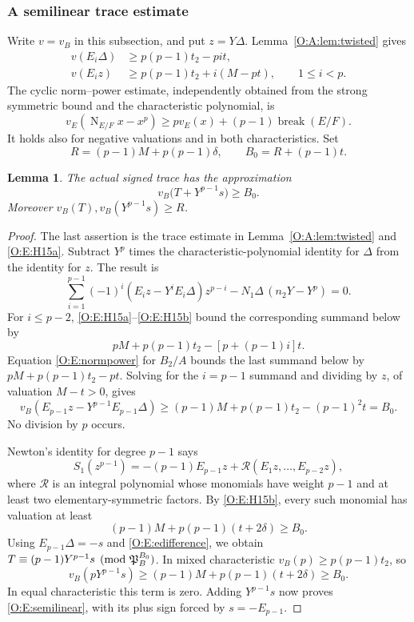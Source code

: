 \documentclass[11pt]{amsart}
\newtheorem{lemma}[theorem]{Lemma}
\theoremstyle{definition}
\theoremstyle{remark}
\newcommand{\Nm}{\operatorname{N}}
\begin{document}
\subsubsection*{A semilinear trace estimate}
Write $v=v_B$ in this subsection, and put $z=Y\Delta$.
Lemma~\ref{O:A:lem:twisted} gives
\begin{align}
 v(E_i\Delta)&\ge p(p-1)t_2-pit,\label{O:E:H15a}\\
 v(E_i z)&\ge p(p-1)t_2+i(M-pt),\qquad1\le i<p.\label{O:E:H15b}
\end{align}
The cyclic norm--power estimate, independently obtained from the
strong symmetric bound and the characteristic polynomial, is
\begin{equation}\label{O:E:normpower}
 v_E(\Nm_{E/F}x-x^p)\ge p v_E(x)+(p-1)\operatorname{break}(E/F).
\end{equation}
It holds also for negative valuations and in both characteristics.
Set
\[
 R=(p-1)M+p(p-1)\delta,\qquad
 B_0=R+(p-1)t.
\]
\begin{lemma}\label{O:E:trace}
The actual signed trace has the approximation
\begin{equation}\label{O:E:semilinear}
 v_B\bigl(T+Y^{p-1}s\bigr)\ge B_0.
\end{equation}
Moreover $v_B(T),v_B(Y^{p-1}s)\ge R$.
\end{lemma}
\begin{proof}
The last assertion is the trace estimate in Lemma~\ref{O:A:lem:twisted} and \eqref{O:E:H15a}.
Subtract $Y^p$ times the characteristic-polynomial identity for
$\Delta$ from the identity for $z$. The result is
\[
 \sum_{i=1}^{p-1}(-1)^i
  (E_i z-Y^iE_i\Delta)z^{p-i}
       -N_1\Delta\,(n_2Y-Y^p)=0.
\]
For $i\le p-2$, \eqref{O:E:H15a}--\eqref{O:E:H15b} bound the corresponding
summand below by
\[
 pM+p(p-1)t_2-[p+(p-1)i]t.
\]
Equation \eqref{O:E:normpower} for $B_2/A$ bounds the last summand below
by $pM+p(p-1)t_2-pt$. Solving for the $i=p-1$ summand and dividing
by $z$, of valuation $M-t>0$, gives
\begin{equation}\label{O:E:edifference}
 v_B(E_{p-1}z-Y^{p-1}E_{p-1}\Delta)
 \ge(p-1)M+p(p-1)t_2-(p-1)^2t=B_0.
\end{equation}
No division by $p$ occurs.

Newton's identity for degree $p-1$ says
\[
 S_1(z^{p-1})=-(p-1)E_{p-1}z+\mathcal R(E_1z,\ldots,E_{p-2}z),
\]
where $\mathcal R$ is an integral polynomial whose monomials have
weight $p-1$ and at least two elementary-symmetric factors.
By \eqref{O:E:H15b}, every such monomial has valuation at least
\[
 (p-1)M+p(p-1)(t+2\delta)\ge B_0.
\]
Using $E_{p-1}\Delta=-s$ and \eqref{O:E:edifference}, we obtain
$T\equiv(p-1)Y^{p-1}s\pmod{\mathfrak P_B^{B_0}}$.
In mixed characteristic
$v_B(p)\ge p(p-1)t_2$, so
\[
 v_B(pY^{p-1}s)\ge(p-1)M+p(p-1)(t+2\delta)\ge B_0.
\]
In equal characteristic this term is zero. Adding $Y^{p-1}s$ now
proves \eqref{O:E:semilinear}, with its plus sign forced by $s=-E_{p-1}$.
\end{proof}
\end{document}
